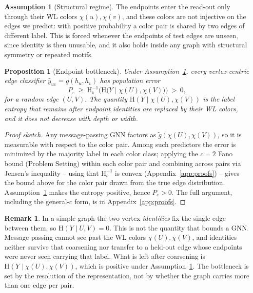 \documentclass[letterpaper]{article} %
\newcommand{\Hh}{\mathrm{H}}
\theoremstyle{plain}
\newtheorem{proposition}{Proposition}
\theoremstyle{definition}
\newtheorem{assumption}{Assumption}
\newtheorem{remark}{Remark}
\begin{document}
\begin{assumption}[Structural regime]
\label{as:structural}
The endpoints enter the read-out only through their WL colors $\chi(u),\chi(v)$, and these colors are not injective on the edges we predict: with positive probability a color pair is shared by two edges of different label. This is forced whenever the endpoints of test edges are unseen, since identity is then unusable, and it also holds inside any graph with structural symmetry or repeated motifs.
\end{assumption}

\begin{proposition}[Endpoint bottleneck]
\label{prop:bottleneck}
Under Assumption~\ref{as:structural}, every vertex-centric edge classifier $\hat y_{uv}=g(h_u,h_v)$ has population error
\[
P_e \ \ge\ \Hh_b^{-1}\Big(\Hh\big(Y\mid \chi(U),\chi(V)\big)\Big)\ >\ 0,
\]
for a random edge $(U,V)$. The quantity $\Hh(Y\mid \chi(U),\chi(V))$ is the label entropy that remains after endpoint identities are replaced by their WL colors, and it does not decrease with depth or width.
\end{proposition}

\begin{proof}[Proof sketch]
Any message-passing GNN factors as $\tilde g(\chi(U),\chi(V))$, so it is measurable with respect to the color pair. Among such predictors the error is minimized by the majority label in each color class; applying the $c=2$ Fano bound (Problem Setting) within each color pair and combining across pairs via Jensen's inequality -- using that $\Hh_b^{-1}$ is convex (Appendix~\ref{app:proofs}) -- gives the bound above for the color pair drawn from the true edge distribution. Assumption~\ref{as:structural} makes the entropy positive, hence $P_e>0$. The full argument, including the general-$c$ form, is in Appendix~\ref{app:proofs}.
\end{proof}

\begin{remark}
In a simple graph the two vertex \emph{identities} fix the single edge between them, so $\Hh(Y\mid U,V)=0$. This is not the quantity that bounds a GNN. Message passing cannot see past the WL colors $\chi(U),\chi(V)$, and identities neither survive that coarsening nor transfer to a held-out edge whose endpoints were never seen carrying that label. What is left after coarsening is $\Hh(Y\mid \chi(U),\chi(V))$, which is positive under Assumption~\ref{as:structural}. The bottleneck is set by the resolution of the representation, not by whether the graph carries more than one edge per pair.
\end{remark}
\end{document}
